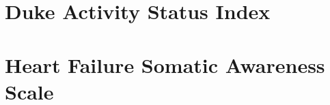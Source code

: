\documentclass{umthesis}
\begin{document}
\begin{appendices}
\section{Duke Activity Status Index} 

\section{Heart Failure Somatic Awareness Scale}


\end{appendices}
\end{document}
